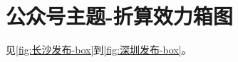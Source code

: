 \documentclass[a4paper,12pt,UTF8]{article}
\begin{document}
    \section{公众号主题-折算效力箱图}
    见\cref{fig:长沙发布-box}到\cref{fig:深圳发布-box}。
    
    \label{applastpage}
    \newpage
    
    

\end{document}
